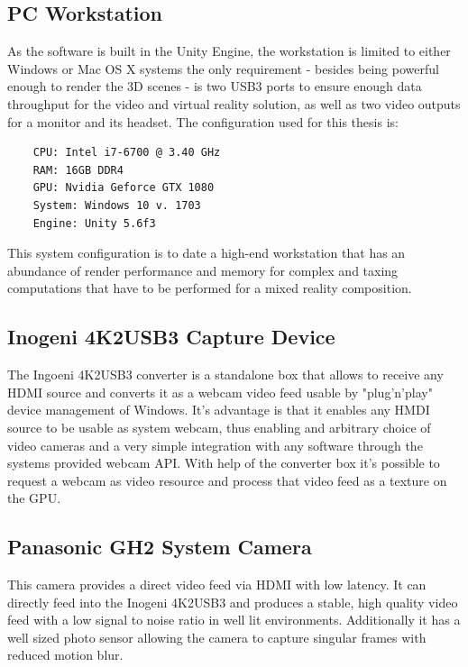 \subsection{PC Workstation}

As the software is built in the Unity Engine, the workstation is limited to 
either Windows or Mac OS X systems the only requirement - besides being 
powerful enough to render the 3D scenes - is two USB3 ports to ensure enough 
data throughput for the video and virtual reality solution, as well as two 
video outputs for a monitor and its headset.
\newline
The configuration used for this thesis is:
\begin{lstlisting}
	CPU: Intel i7-6700 @ 3.40 GHz
	RAM: 16GB DDR4
	GPU: Nvidia Geforce GTX 1080
	System: Windows 10 v. 1703
	Engine: Unity 5.6f3
\end{lstlisting}

This system configuration is to date a high-end workstation that has an 
abundance of render performance and memory for complex and taxing computations 
that have to be performed for a mixed reality composition.

\subsection{Inogeni 4K2USB3 Capture Device}
The Ingoeni 4K2USB3 converter is a standalone box that allows to receive any 
HDMI source and converts it as a webcam video feed usable by "plug'n'play" 
device management of Windows. It's advantage is that it enables any HMDI source 
to be usable as system webcam, thus enabling and arbitrary choice of video 
cameras and a very simple integration with any software through the systems 
provided webcam API. With help of the converter box it's possible to request a 
webcam as video resource and process that video feed as a texture on the GPU.

\subsection{Panasonic GH2 System Camera}
This camera provides a direct video feed via HDMI with low latency. It can 
directly feed into the Inogeni 4K2USB3 and produces a stable, high quality 
video feed with a low signal to noise ratio in well lit environments. 
Additionally it has a well sized photo sensor allowing the camera to capture 
singular frames with reduced motion blur.

